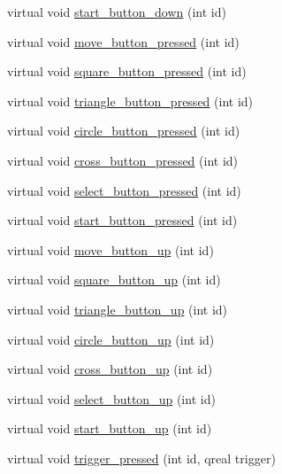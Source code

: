 \begin{DoxyCompactItemize}
\item 
virtual void \hyperlink{class_base_menu_a2e7b8a119848a67c9375cbefb7bdbc69}{start\-\_\-button\-\_\-down} (int id)
\item 
virtual void \hyperlink{class_base_menu_a0a9ed550dbeb47f37528c0ab85790e68}{move\-\_\-button\-\_\-pressed} (int id)
\item 
virtual void \hyperlink{class_base_menu_aa8983e9c373ef131412d8fde71c735f8}{square\-\_\-button\-\_\-pressed} (int id)
\item 
virtual void \hyperlink{class_base_menu_a2a96194274f8f38774ce9b4f57322f12}{triangle\-\_\-button\-\_\-pressed} (int id)
\item 
virtual void \hyperlink{class_base_menu_a2eedfd849fb5447cf10584abf4276feb}{circle\-\_\-button\-\_\-pressed} (int id)
\item 
virtual void \hyperlink{class_base_menu_a7e505a84e4ddc33a06b9c3ea7caf04c5}{cross\-\_\-button\-\_\-pressed} (int id)
\item 
virtual void \hyperlink{class_base_menu_a0ad79ba5715550115cc49b7aa195d9b0}{select\-\_\-button\-\_\-pressed} (int id)
\item 
virtual void \hyperlink{class_base_menu_ac5353c43e94cf6bb5de620fe7632b20b}{start\-\_\-button\-\_\-pressed} (int id)
\item 
virtual void \hyperlink{class_base_menu_aa73239e64789bf85c1d510abbae18189}{move\-\_\-button\-\_\-up} (int id)
\item 
virtual void \hyperlink{class_base_menu_a12a4872dc160c013fa3499bf1f6549b8}{square\-\_\-button\-\_\-up} (int id)
\item 
virtual void \hyperlink{class_base_menu_acb41522bb7a004a24df7ea3e115b2c72}{triangle\-\_\-button\-\_\-up} (int id)
\item 
virtual void \hyperlink{class_base_menu_a36ebfe4ba13a911e489961cdfc5950a6}{circle\-\_\-button\-\_\-up} (int id)
\item 
virtual void \hyperlink{class_base_menu_a76fe15e2856203059db24c9c56c1383a}{cross\-\_\-button\-\_\-up} (int id)
\item 
virtual void \hyperlink{class_base_menu_aea510dbeea4fc2859051603acf730d03}{select\-\_\-button\-\_\-up} (int id)
\item 
virtual void \hyperlink{class_base_menu_a8b847f9ed80538c5e96e868ed87ab3c7}{start\-\_\-button\-\_\-up} (int id)
\item 
virtual void \hyperlink{class_base_menu_adb277f30427d5811f86f8699b04c4abe}{trigger\-\_\-pressed} (int id, qreal trigger)
\end{DoxyCompactItemize}
